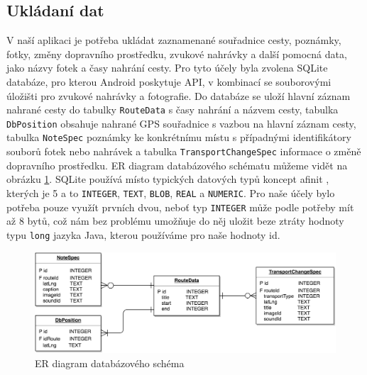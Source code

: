 \documentclass{article}
\begin{document}
\subsection{Ukládaní dat}
V naší aplikaci je potřeba ukládat zaznamenané souřadnice cesty, poznámky, fotky, změny dopravního
prostředku, zvukové nahrávky a další pomocná data, jako názvy fotek a časy nahrání cesty. Pro tyto
účely byla zvolena SQLite databáze, pro kterou Android poskytuje API, v kombinací se souborovými úložišti
pro zvukové nahrávky a fotografie. Do databáze se uloží hlavní záznam nahrané cesty do tabulky \texttt{RouteData}
s časy nahrání a názvem cesty, tabulka \texttt{DbPosition} obsahuje nahrané GPS souřadnice s vazbou
na hlavní záznam cesty, tabulka \texttt{NoteSpec} poznámky ke konkrétnímu místu s případnými identifikátory
souborů fotek nebo nahrávek a tabulka \texttt{TransportChangeSpec} informace o změně dopravního prostředku.
ER diagram databázového schématu můžeme vidět na obrázku \ref{fig:db_er}. SQLite používá místo typických datových typů koncept afinit
\cite{sqlitetypes}, kterých je 5 a to \texttt{INTEGER}, \texttt{TEXT}, \texttt{BLOB}, \texttt{REAL} a \texttt{NUMERIC}.
Pro naše účely bylo potřeba pouze využít prvních dvou, neboť typ \texttt{INTEGER} může podle potřeby
mít až 8 bytů\cite{sqlitetypes}, což nám bez problému umožňuje do něj uložit beze ztráty hodnoty typu
\texttt{long} jazyka Java, kterou používáme pro naše hodnoty id.


\begin{figure}[H]
        \centering
                \includegraphics[scale=0.2]{img/db_er.png}
        \caption{ER diagram databázového schéma}
        \label{fig:db_er}
\end{figure}
\end{document}
